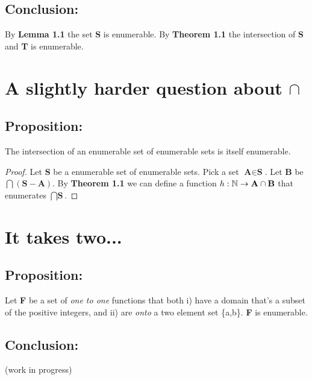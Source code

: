\documentclass[a4paper,11pt]{article}
\begin{document}
	\subsection*{Conclusion:}
	By \textbf{Lemma 1.1} the set \textbf{S} is enumerable.  By \textbf{Theorem 1.1} the intersection
	of \textbf{S} and \textbf{T} is enumerable.
		
\pagebreak


\section{A slightly harder question about $\cap$}

	\subsection*{Proposition:}
	The intersection of an enumerable set of enumerable sets is itself enumerable.

	\bigskip
	
	\begin{proof}
	Let \textbf{S} be a enumerable set of enumerable sets. Pick a set $\textbf{A} \in \textbf{S}$. Let
	\textbf{B} be $\bigcap (\textbf{S} - \textbf{A})$. By \textbf{Theorem 1.1} we can define a function 
	$\mathnormal{h}: \mathbb{N} \rightarrow \textbf{A} \cap \textbf{B}$ that enumerates $\bigcap \textbf{S}$.	
	\end{proof}


\section{It takes two...}

	\subsection*{Proposition:}
	Let \textbf{F} be a set of \textit{one to one} functions that both i) have a domain that's a subset of the positive
	integers, and ii) are \textit{onto} a two element set \{a,b\}. \textbf{F} is enumerable.

	\subsection*{Conclusion:}
	(work in progress)
	
\pagebreak

\end{document}
